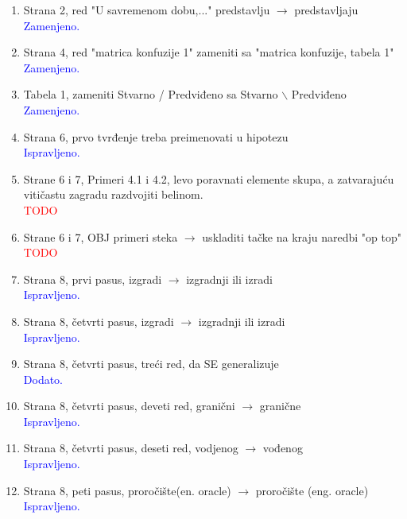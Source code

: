 \documentclass[a4paper]{report}
\newcommand{\odgovor}[1]{\textcolor{blue}{#1}}
\newcommand{\todo}[1]{\textcolor{red}{#1}}
\begin{document}
\begin{enumerate}
\item Strana 2, red "U savremenom dobu,..." predstavlju $\rightarrow$ predstavljaju
\\ \odgovor{Zamenjeno.}

\item Strana 4, red "matrica konfuzije 1" zameniti sa "matrica konfuzije, tabela 1"
\\ \odgovor{Zamenjeno.}

\item Tabela 1, zameniti Stvarno / Predviđeno sa Stvarno $\backslash$ Predviđeno
\\ \odgovor{Zamenjeno.}

\item Strana 6, prvo tvrđenje treba preimenovati u hipotezu
\\\odgovor{Ispravljeno.}

\item Strane 6 i 7, Primeri 4.1 i 4.2, levo poravnati elemente skupa,
a zatvarajuću vitičastu zagradu razdvojiti belinom.
\\\todo{TODO}

\item Strane 6 i 7, OBJ primeri steka $\rightarrow$ uskladiti tačke na kraju naredbi "op top"
\\\todo{TODO}

\item Strana 8, prvi pasus, izgradi $\rightarrow$ izgradnji ili izradi
\\ \odgovor{Ispravljeno.}

\item Strana 8, četvrti pasus, izgradi $\rightarrow$ izgradnji ili izradi
\\ \odgovor{Ispravljeno.}

\item Strana 8, četvrti pasus, treći red, da SE generalizuje
\\ \odgovor{Dodato.}

\item Strana 8, četvrti pasus, deveti red, granični $\rightarrow$ granične
\\ \odgovor{Ispravljeno.}

\item Strana 8, četvrti pasus, deseti red, vodjenog $\rightarrow$ vođenog
\\ \odgovor{Ispravljeno.}

\item Strana 8, peti pasus, proročište(en. oracle) $\rightarrow$ proročište (eng. oracle)
\\ \odgovor{Ispravljeno.}


\end{enumerate}
\end{document}
